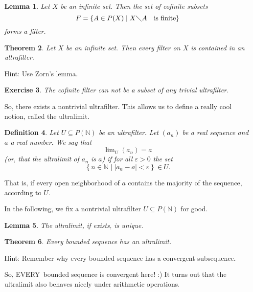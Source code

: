 \documentclass[12pt]{article}
\newtheorem{theorem}{Theorem}
\newtheorem{definition}[theorem]{Definition}
\newtheorem{exercise}[theorem]{Exercise}
\newtheorem{lemma}[theorem]{Lemma}
\begin{document}
\begin{lemma}
Let $X$ be an infinite set. Then the set of cofinite subsets 
\begin{equation*}
F=\left\{ A\in P(X)\mid X\diagdown A\text{ is finite}\right\} 
\end{equation*}
forms a filter.
\end{lemma}

\begin{theorem}
Let $X$ be an infinite set. Then every filter on $X$ is contained in an
ultrafilter.
\end{theorem}

Hint: Use Zorn's lemma.

\begin{exercise}
The cofinite filter can not be a subset of any trivial ultrafilter.
\end{exercise}

So, there exists a nontrivial ultrafilter. This allows us to define a really
cool notion, called the ultralimit.

\begin{definition}
Let $U\subseteq P(\mathbb{N})$ be an ultrafilter. Let $(a_{n})$ be a real
sequence and $a$ a real number. We say that 
\begin{equation*}
\lim\nolimits_{U}(a_{n})=a 
\end{equation*}
(or, that the \emph{ultralimit} of $a_{n}$ is $a$) if for all $\varepsilon>0$
the set 
\begin{equation*}
\left\{ n\in\mathbb{N}\mid\left\vert a_{n}-a\right\vert <\varepsilon\right\}
\in U\text{.}
\end{equation*}
\end{definition}

That is, if every open neighborhood of $a$ contains the majority of the
sequence, according to $U$.

In the following, we fix a nontrivial ultrafilter $U\subseteq P(\mathbb{N})$
for good.

\begin{lemma}
The ultralimit, if exists, is unique.
\end{lemma}

\begin{theorem}
Every bounded sequence has an ultralimit.
\end{theorem}

Hint: Remember why every bounded sequence has a convergent subsequence.
\bigskip

So, EVERY\ bounded sequence is convergent here! :) It turns out that the
ultralimit also behaves nicely under arithmetic operations.
\end{document}
